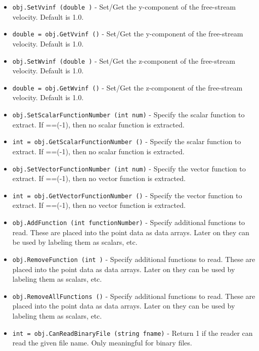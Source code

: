\begin{itemize}
\item  \verb|obj.SetVvinf (double )| -  Set/Get the y-component of the free-stream velocity. Default is 1.0.

\item  \verb|double = obj.GetVvinf ()| -  Set/Get the y-component of the free-stream velocity. Default is 1.0.

\item  \verb|obj.SetWvinf (double )| -  Set/Get the z-component of the free-stream velocity. Default is 1.0.

\item  \verb|double = obj.GetWvinf ()| -  Set/Get the z-component of the free-stream velocity. Default is 1.0.

\item  \verb|obj.SetScalarFunctionNumber (int num)| -  Specify the scalar function to extract. If ==(-1), then no scalar 
 function is extracted.

\item  \verb|int = obj.GetScalarFunctionNumber ()| -  Specify the scalar function to extract. If ==(-1), then no scalar 
 function is extracted.

\item  \verb|obj.SetVectorFunctionNumber (int num)| -  Specify the vector function to extract. If ==(-1), then no vector
 function is extracted.

\item  \verb|int = obj.GetVectorFunctionNumber ()| -  Specify the vector function to extract. If ==(-1), then no vector
 function is extracted.

\item  \verb|obj.AddFunction (int functionNumber)| -  Specify additional functions to read. These are placed into the
 point data as data arrays. Later on they can be used by labeling
 them as scalars, etc.

\item  \verb|obj.RemoveFunction (int )| -  Specify additional functions to read. These are placed into the
 point data as data arrays. Later on they can be used by labeling
 them as scalars, etc.

\item  \verb|obj.RemoveAllFunctions ()| -  Specify additional functions to read. These are placed into the
 point data as data arrays. Later on they can be used by labeling
 them as scalars, etc.

\item  \verb|int = obj.CanReadBinaryFile (string fname)| -  Return 1 if the reader can read the given file name. Only meaningful
 for binary files.

\end{itemize}

